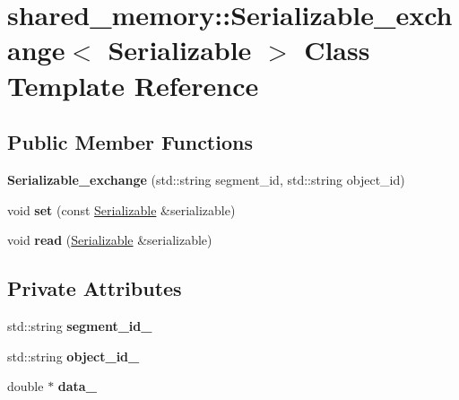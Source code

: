 \hypertarget{classshared__memory_1_1Serializable__exchange}{}\section{shared\+\_\+memory\+:\+:Serializable\+\_\+exchange$<$ Serializable $>$ Class Template Reference}
\label{classshared__memory_1_1Serializable__exchange}
\subsection*{Public Member Functions}
\begin{DoxyCompactItemize}
\item 
{\bfseries Serializable\+\_\+exchange} (std\+::string segment\+\_\+id, std\+::string object\+\_\+id)\hypertarget{classshared__memory_1_1Serializable__exchange_acb92a032cbc772e4d327d98208b214d3}{}\label{classshared__memory_1_1Serializable__exchange_acb92a032cbc772e4d327d98208b214d3}

\item 
void {\bfseries set} (const \hyperlink{classSerializable}{Serializable} \&serializable)\hypertarget{classshared__memory_1_1Serializable__exchange_a29943c12f26bbd6e876b979d366fd110}{}\label{classshared__memory_1_1Serializable__exchange_a29943c12f26bbd6e876b979d366fd110}

\item 
void {\bfseries read} (\hyperlink{classSerializable}{Serializable} \&serializable)\hypertarget{classshared__memory_1_1Serializable__exchange_a3b69842f01b73a15bfefed264b8e3dd3}{}\label{classshared__memory_1_1Serializable__exchange_a3b69842f01b73a15bfefed264b8e3dd3}

\end{DoxyCompactItemize}
\subsection*{Private Attributes}
\begin{DoxyCompactItemize}
\item 
std\+::string {\bfseries segment\+\_\+id\+\_\+}\hypertarget{classshared__memory_1_1Serializable__exchange_a495d9d0320ec199625deed0f1cd0ea20}{}\label{classshared__memory_1_1Serializable__exchange_a495d9d0320ec199625deed0f1cd0ea20}

\item 
std\+::string {\bfseries object\+\_\+id\+\_\+}\hypertarget{classshared__memory_1_1Serializable__exchange_a21968aa2fbfc11fa6ecc298320ebfb9a}{}\label{classshared__memory_1_1Serializable__exchange_a21968aa2fbfc11fa6ecc298320ebfb9a}

\item 
double $\ast$ {\bfseries data\+\_\+}\hypertarget{classshared__memory_1_1Serializable__exchange_a1923d2803a05846f61ee4738dac10674}{}\label{classshared__memory_1_1Serializable__exchange_a1923d2803a05846f61ee4738dac10674}

\end{DoxyCompactItemize}


